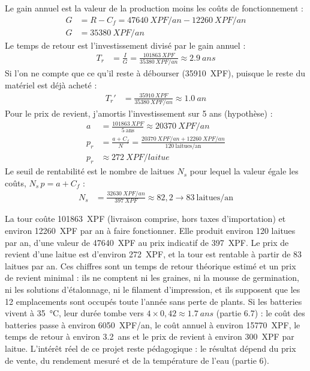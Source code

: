 \begin{demonstration}
Le gain annuel est la valeur de la production moins les coûts de fonctionnement :
\begin{align*}
G &= R - C_f = \qty{47640}{XPF/an} - \qty{12260}{XPF/an}\\
G &= \qty{35380}{XPF/an}
\end{align*}
Le temps de retour est l'investissement divisé par le gain annuel :
\begin{align*}
T_r &= \frac{I}{G} = \frac{\qty{101863}{XPF}}{\qty{35380}{XPF/an}} \approx \qty{2,9}{ans}
\end{align*}
Si l'on ne compte que ce qu'il reste à débourser (\qty{35910}{XPF}), puisque le reste du matériel est déjà acheté :
\begin{align*}
T_r' &= \frac{\qty{35910}{XPF}}{\qty{35380}{XPF/an}} \approx \qty{1,0}{an}
\end{align*}
Pour le prix de revient, j'amortis l'investissement sur 5 ans (hypothèse) :
\begin{align*}
a &= \frac{\qty{101863}{XPF}}{5\ \text{ans}} \approx \qty{20370}{XPF/an}\\
p_r &= \frac{a + C_f}{N} = \frac{\qty{20370}{XPF/an} + \qty{12260}{XPF/an}}{120\ \text{laitues/an}}\\
p_r &\approx \qty{272}{XPF/laitue}
\end{align*}
Le seuil de rentabilité est le nombre de laitues $N_s$ pour lequel la valeur égale les coûts, $N_s\,p = a + C_f$ :
\begin{align*}
N_s &= \frac{\qty{32630}{XPF/an}}{\qty{397}{XPF}} \approx 82{,}2 \longrightarrow 83\ \text{laitues/an}
\end{align*}
\end{demonstration}

\begin{aretenir}
La tour coûte \qty{101863}{XPF} (livraison comprise, hors taxes d'importation) et environ \qty{12260}{XPF} par an à faire fonctionner. Elle produit environ 120 laitues par an, d'une valeur de \qty{47640}{XPF} au prix indicatif de \qty{397}{XPF}. Le prix de revient d'une laitue est d'environ \qty{272}{XPF}, et la tour est rentable à partir de 83 laitues par an. Ces chiffres sont un temps de retour théorique estimé et un prix de revient minimal : ils ne comptent ni les graines, ni la mousse de germination, ni les solutions d'étalonnage, ni le filament d'impression, et ils supposent que les 12 emplacements sont occupés toute l'année sans perte de plants. Si les batteries vivent à \qty{35}{\celsius}, leur durée tombe vers $4 \times 0{,}42 \approx \qty{1,7}{ans}$ (partie 6.7) : le coût des batteries passe à environ \qty{6050}{XPF/an}, le coût annuel à environ \qty{15770}{XPF}, le temps de retour à environ \qty{3,2}{ans} et le prix de revient à environ \qty{300}{XPF} par laitue. L'intérêt réel de ce projet reste pédagogique : le résultat dépend du prix de vente, du rendement mesuré et de la température de l'eau (partie 6).
\end{aretenir}

